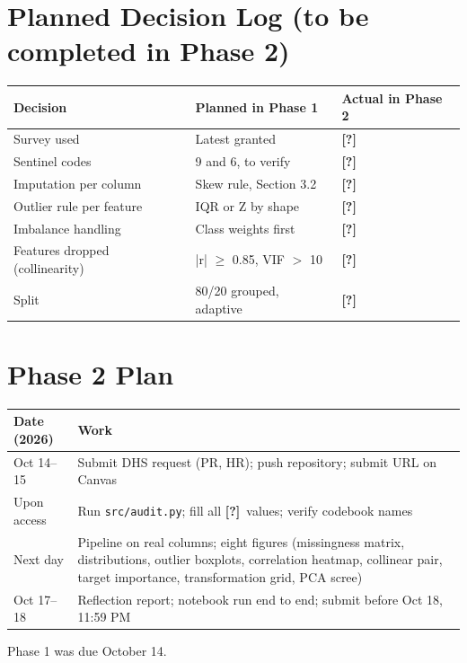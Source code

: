 \documentclass[11pt,a4paper]{article}
\newcommand{\Q}{\textbf{[?]}}   %
\begin{document}
\section{Planned Decision Log (to be completed in Phase 2)}
\begin{center}\small
\begin{tabular}{@{}p{4cm}p{5.2cm}p{5cm}@{}}\toprule
Decision & Planned in Phase 1 & Actual in Phase 2\\\midrule
Survey used & Latest granted & \Q\\
Sentinel codes & 9 and 6, to verify & \Q\\
Imputation per column & Skew rule, Section 3.2 & \Q\\
Outlier rule per feature & IQR or Z by shape & \Q\\
Imbalance handling & Class weights first & \Q\\
Features dropped (collinearity) & |r| $\ge$ 0.85, VIF $>$ 10 & \Q\\
Split & 80/20 grouped, adaptive & \Q\\\bottomrule
\end{tabular}\end{center}

\section{Phase 2 Plan}
\begin{center}\small
\begin{tabular}{@{}p{3.6cm}p{10.7cm}@{}}\toprule
Date (2026) & Work\\\midrule
Oct 14--15 & Submit DHS request (PR, HR); push repository; submit URL on Canvas\\
Upon access & Run \texttt{src/audit.py}; fill all \Q\ values; verify codebook names\\
Next day & Pipeline on real columns; eight figures (missingness matrix, distributions, outlier boxplots, correlation heatmap, collinear pair, target importance, transformation grid, PCA scree)\\
Oct 17--18 & Reflection report; notebook run end to end; submit before Oct 18, 11:59 PM\\\bottomrule
\end{tabular}\end{center}
Phase 1 was due October 14.



\end{document}
